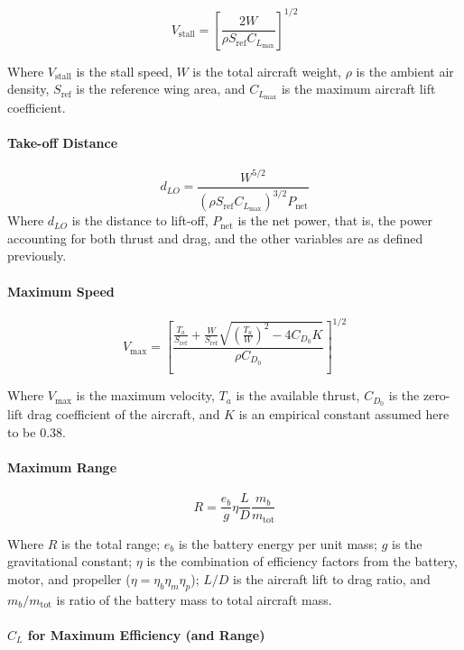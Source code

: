 \[V_\text{stall} = \left[ \frac{2W}{\rho S_\text{ref} C_{L_\text{max}}} \right]^{1/2}\]

Where \(V_\text{stall}\) is the stall speed, \(W\) is the total aircraft weight, \(\rho\) is the ambient air density, \(S_\text{ref}\) is the reference wing area, and \(C_{L_\text{max}}\) is the maximum aircraft lift coefficient.

\paragraph{Take-off Distance}

\[ d_{LO} = \frac{ W^{5/2} }{ \left( \rho S_\text{ref} C_{L_\text{max}} \right)^{3/2} P_\text{net} } \]
Where \(d_{LO}\) is the distance to lift-off, \(P_\text{net}\) is the net power, that is, the power accounting for both thrust and drag, and the other variables are as defined previously.

\paragraph{Maximum Speed}

\[ V_\text{max} = \left[ \frac{ \frac{T_a}{S_\text{ref}} + \frac{W}{S_\text{ref}}\sqrt{\left(\frac{T_a}{W}\right)^2 - 4C_{D_0}K } }{\rho C_{D_0}} \right]^{1/2} \]

Where \(V_\text{max}\) is the maximum velocity, \(T_a\) is the available thrust, \(C_{D_0}\) is the zero-lift drag coefficient of the aircraft, and \(K\) is an empirical constant assumed here to be 0.38.

\paragraph{Maximum Range}

\[R = \frac{e_b}{g} \eta \frac{L}{D} \frac{m_b}{m_\text{tot}}\]

Where \(R\) is the total range; \(e_b\) is the battery energy per unit mass; \(g\) is the gravitational constant; \(\eta\) is the combination of efficiency factors from the battery, motor, and propeller (\(\eta=\eta_b\eta_m\eta_p\)); \(L/D\) is the aircraft lift to drag ratio, and \(m_b/m_\text{tot}\) is ratio of the battery mass to total aircraft mass.

\paragraph{\(C_L\) for Maximum Efficiency (and Range)}

